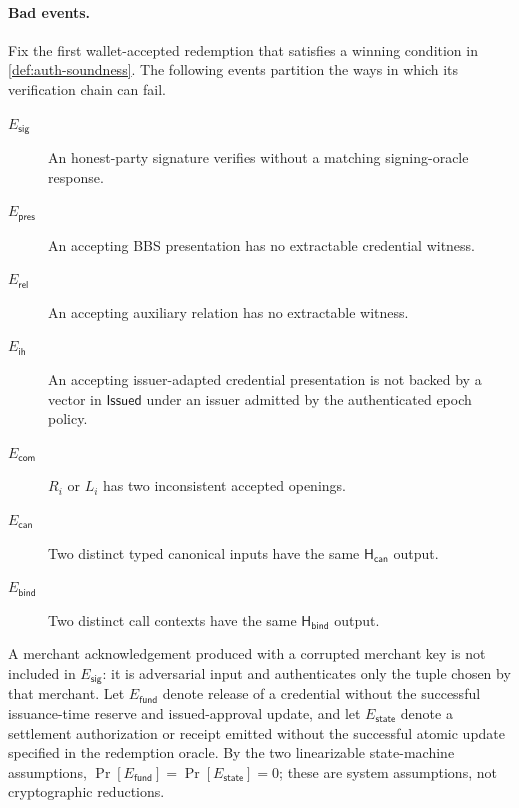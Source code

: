 \documentclass[letterpaper]{article}
\newcommand{\hash}{\mathsf{H}_{\mathsf{can}}}
\newcommand{\hashBind}{\mathsf{H}_{\mathsf{bind}}}
\begin{document}
\paragraph{Bad events.}
Fix the first wallet-accepted redemption that satisfies a winning condition in
\cref{def:auth-soundness}. The following events partition the ways in which its
verification chain can fail.
\begin{description}
  \item[\(E_{\mathsf{sig}}\)] An honest-party signature verifies without a
  matching signing-oracle response.
  \item[\(E_{\mathsf{pres}}\)] An accepting BBS presentation has no extractable
  credential witness.
  \item[\(E_{\mathsf{rel}}\)] An accepting auxiliary relation has no
  extractable witness.
  \item[\(E_{\mathsf{ih}}\)] An accepting issuer-adapted credential
  presentation is not backed by a vector in \(\mathsf{Issued}\) under an issuer
  admitted by the authenticated epoch policy.
  \item[\(E_{\mathsf{com}}\)] \(R_i\) or \(L_i\) has two inconsistent accepted
  openings.
  \item[\(E_{\mathsf{can}}\)] Two distinct typed canonical inputs have the same
  \(\hash\) output.
  \item[\(E_{\mathsf{bind}}\)] Two distinct call contexts have the same
  \(\hashBind\) output.
\end{description}
A merchant acknowledgement produced with a corrupted merchant key is not included in
\(E_{\mathsf{sig}}\): it is adversarial input and authenticates only the tuple
chosen by that merchant. Let \(E_{\mathsf{fund}}\) denote release of a
credential without the successful issuance-time reserve and issued-approval
update, and let \(E_{\mathsf{state}}\) denote a settlement
authorization or receipt emitted without the successful atomic update
specified in the redemption oracle. By the two linearizable state-machine
assumptions,
\(\Pr[E_{\mathsf{fund}}]=\Pr[E_{\mathsf{state}}]=0\); these are system
assumptions, not cryptographic reductions.
\end{document}
